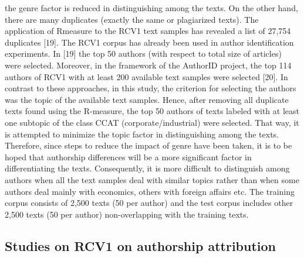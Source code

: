 the genre factor is reduced in distinguishing among the texts. On the other hand, there
are many duplicates (exactly the same or plagiarized texts). The application of Rmeasure to the RCV1 text samples has revealed a list of 27,754 duplicates [19].
The RCV1 corpus has already been used in author identification experiments. In
[19] the top 50 authors (with respect to total size of articles) were selected. Moreover,
in the framework of the AuthorID project, the top 114 authors of RCV1 with at least
200 available text samples were selected [20]. In contrast to these approaches, in this
study, the criterion for selecting the authors was the topic of the available text
samples. Hence, after removing all duplicate texts found using the R-measure, the top 50 authors of texts labeled with at least one subtopic of the class CCAT
(corporate/industrial) were selected. That way, it is attempted to minimize the topic
factor in distinguishing among the texts. Therefore, since steps to reduce the impact of
genre have been taken, it is to be hoped that authorship differences will be a more
significant factor in differentiating the texts. Consequently, it is more difficult to
distinguish among authors when all the text samples deal with similar topics rather
than when some authors deal mainly with economics, others with foreign affairs etc.
The training corpus consists of 2,500 texts (50 per author) and the test corpus includes
other 2,500 texts (50 per author) non-overlapping with the training texts. \cite{houvardas2006n}

\subsection{Studies on RCV1 on authorship attribution}

